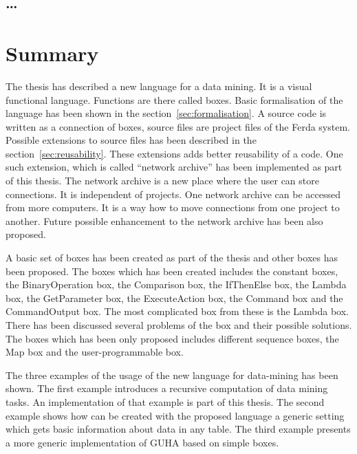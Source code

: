 \documentclass[a4paper,12pt]{book}
\begin{document}
\section{\dots}
\chapter{Summary}
The thesis has described a new language for a data mining. It is a visual functional language. Functions are there called boxes. Basic formalisation of the language has been shown in the section~\ref{sec:formalisation}. A source code is written as a connection of boxes, source files are project files of the Ferda system. Possible extensions to source files has been described in the section~\ref{sec:reusability}. These extensions adds better reusability of a code. One such extension, which is called ``network archive'' has been implemented as part of this thesis. The network archive is a new place where the user can store connections. It is independent of projects. One network archive can be accessed from more computers. It is a way how to move connections from one project to another. Future possible enhancement to the network archive has been also proposed.

A basic set of boxes has been created as part of the thesis and other boxes has been proposed. The boxes which has been created includes the constant boxes, the BinaryOperation box, the Comparison box, the IfThenElse box, the Lambda box, the GetParameter box, the ExecuteAction box, the Command box and the CommandOutput box. The most complicated box from these is the Lambda box. There has been discussed several problems of the box and their possible solutions. The boxes which has been only proposed includes different sequence boxes, the Map box and the user-programmable box.

The three examples of the usage of the new language for data-mining has been shown. The first example introduces a recursive computation of data mining tasks. An implementation of that example is part of this thesis. The second example shows how can be created with the proposed language a generic setting which gets basic information about data in any table. The third example presents a more generic implementation of GUHA based on simple boxes.

\end{document}
